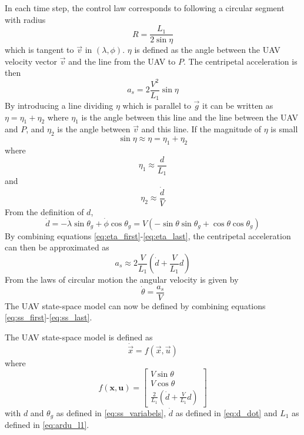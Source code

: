  In each time step, the control law corresponds to following a circular segment with radius
 \begin{equation}
    R=\frac{L_1}{2\sin\eta}
 \end{equation}
 which is tangent to $\vec{v}$ in $(\lambda,\phi)$.
 $\eta$ is defined as the angle between the UAV velocity vector $\vec{v}$ and the line from the UAV to $P$. The centripetal acceleration is then 
\begin{equation}
    a_s=2\frac{V^2}{L_1}\sin\eta
\end{equation}
By introducing a line dividing $\eta$ which is parallel to $\vec{g}$ it can be written as $\eta=\eta_1+\eta_2$ 
where $\eta_1$ is the angle between this line and the line between the UAV 
and $P$, and $\eta_2$ is the angle between $\vec{v}$ and this line.
If the magnitude of $\eta$ is small
\begin{equation}\label{eq:eta_first}
    \sin\eta\approx\eta=\eta_1+\eta_2
\end{equation} 
where
\begin{equation}
    \eta_1\approx \frac{d}{L_1}
\end{equation}
and
\begin{equation}\label{eq:eta_last}
    \eta_2\approx \frac{\dot{d}}{V}
\end{equation}
From the definition of $d$,
\begin{equation}\label{eq:d_dot}
    \dot{d} = -\dot{\lambda}\sin\theta_g + \dot{\phi}\cos\theta_g = V(-\sin\theta\sin\theta_g + \cos\theta\cos\theta_g)
\end{equation}
By combining equations \eqref{eq:eta_first}-\eqref{eq:eta_last}, the centripetal acceleration can then be approximated as
\begin{equation}
    a_s\approx2\frac{V}{L_1}\left(\dot{d} + \frac{V}{L_1}d\right)
\end{equation}
From the laws of circular motion the angular velocity is given by
\begin{equation}\label{eq:ss_last}
    \dot{\theta}=\frac{a_s}{V}
\end{equation}
The UAV state-space model can now be defined by combining equations \eqref{eq:ss_first}-\eqref{eq:ss_last}.

\begin{definition}
The UAV state-space model is defined as 
\begin{equation}
    \dot{\vec{x}} = f(\vec{x}, \vec{u})
\end{equation}
where
\begin{equation}
    f(\mathbf{x}, \mathbf{u}) = \begin{bmatrix}
    V\sin\theta \\
    V\cos\theta \\
    \frac{2}{L_1}\left(\dot{d} + \frac{V}{L_1}d\right)
    \end{bmatrix}
\end{equation}
with $d$ and $\theta_g$ as defined in \eqref{eq:ss_variabels}, $\dot{d}$ as defined in \eqref{eq:d_dot} and $L_1$ as defined in \eqref{eq:ardu_l1}.
\end{definition}


